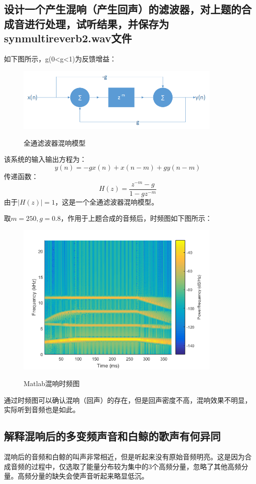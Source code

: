 \documentclass{article}
\begin{document}
        \subsection{设计一个产生混响（产生回声）的滤波器，对上题的合成音进行处理，试听结果，并保存为synmultireverb2.wav文件}
            如下图所示，g(0<g<1)为反馈增益：
            \begin{figure}[htb]
                \centering
                \includegraphics[width=10cm]{figure16.png}
                \label{fig:reverb2-1}\caption{全通滤波器混响模型}
            \end{figure}
            
            该系统的输入输出方程为：
            $$y(n)=-gx(n)+x(n-m)+gy(n-m)$$
            传递函数：
            $$H(z)=\frac{z^{-m}-g}{1-gz^{-m}}$$
            由于$|H(z)|=1$，这是一个全通滤波器混响模型。
            
            取$m=250, g=0.8$，作用于上题合成的音频后，时频图如下图所示：
            \begin{figure}[H]
                \centering
                \includegraphics[width=10cm]{figure17.png}
                \label{fig:reverb2-2}\caption{Matlab混响时频图}
            \end{figure}
            
            通过时频图可以确认混响（回声）的存在，但是回声密度不高，混响效果不明显，实际听到音频也是如此。
            
        \subsection{解释混响后的多变频声音和白鲸的歌声有何异同}
            混响后的音频和白鲸的叫声非常相近，但是听起来没有原始音频明亮。这是因为合成音频的过程中，仅选取了能量分布较为集中的3个高频分量，忽略了其他高频分量。高频分量的缺失会使声音听起来略显低沉。
            
\end{document}
